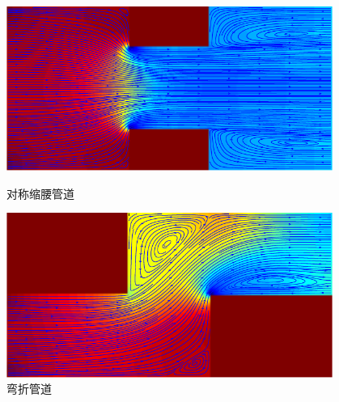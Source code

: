 \documentclass[a4paper,boxed,11pt]{caspset}
\begin{document}
\begin{figure}[!htb]
\begin{minipage}[b]{.5\textwidth}
\centering
\includegraphics[width=0.95\textwidth]{./figures/05.pdf}
\caption{对称缩腰管道}
\end{minipage}
\begin{minipage}[b]{.5\textwidth}
\centering
\includegraphics[width=0.95\textwidth]{./figures/06.pdf}
\caption{弯折管道}
\end{minipage}
\end{figure}
\end{document}
